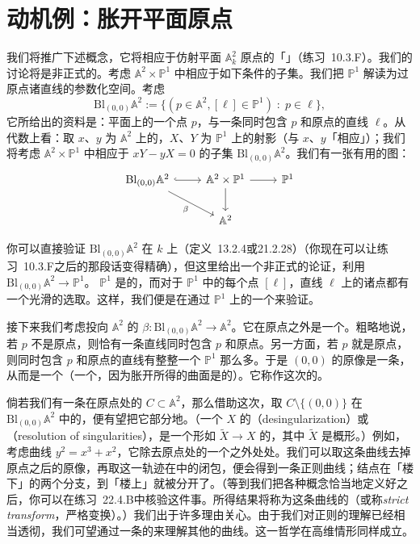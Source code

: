 
\section{动机例：胀开平面原点}

我们将推广下述概念，它将相应于仿射平面 $\mathbb{A}^2_k$ 原点的「\trBlowup」（\mbox{练习~10.3.F}）。我们的讨论将是非正式的。考虑 $\mathbb{A}^2\times\mathbb{P}^1$ 中相应于如下条件的子集。我们把 $\mathbb{P}^1$ 解读为过原点诸直线的参数化空间。考虑\trSubvariety
\[
\mathrm{Bl}_{(0,0)}\mathbb{A}^2:=\{(p\in\mathbb{A}^2,[\ell]\in\mathbb{P}^1)\;:\;p\in\ell\},
\]
它所给出的资料是：平面上的一个点 $p$，与一条同时包含 $p$ 和原点的直线 $\ell$。从代数上看：取 $x$、$y$ 为 $\mathbb{A}^2$ 上的\trCoordinate，$X$、$Y$ 为 $\mathbb{P}^1$ 上的射影\trCoordinate（与 $x$、$y$「相应」）；我们将考虑 $\mathbb{A}^2\times\mathbb{P}^1$ 中相应于 $xY-yX=0$ 的子集 $\mathrm{Bl}_{(0,0)}\mathbb{A}^2$。我们有一张有用的图：
\[
\begin{tikzcd}
\mathrm{Bl}_{(0,0)}\mathbb{A}^2\ar[r,hook]\ar[rd,"\beta"'] & \mathbb{A}^2\times\mathbb{P}^1\ar[r]\ar[d] & \mathbb{P}^1 \\
& \mathbb{A}^2 &
\end{tikzcd}
\]

你可以直接验证 $\mathrm{Bl}_{(0,0)}\mathbb{A}^2$ 在 $k$ 上\trSmooth{}（\mbox{定义~13.2.4}或\mbox{21.2.28}）（你现在可以让\mbox{练习~10.3.F}之后的那段话变得精确），但这里给出一个非正式的论证，利用\trProjection{} $\mathrm{Bl}_{(0,0)}\mathbb{A}^2\to\mathbb{P}^1$。\trProjectiveLine{} $\mathbb{P}^1$ 是\trSmooth{}的，而对于 $\mathbb{P}^1$ 中的每个点 $[\ell]$，直线 $\ell$ 上的诸点都有一个光滑的选取。这样，我们便是在通过 $\mathbb{P}^1$ 上的一个\trFibration{}来验证\trSmoothness。

接下来我们考虑投向 $\mathbb{A}^2$ 的\trProjection{} $\beta\colon\mathrm{Bl}_{(0,0)}\mathbb{A}^2\to\mathbb{A}^2$。它在原点之外是一个\trIsomorphism。粗略地说，若 $p$ 不是原点，则恰有一条直线同时包含 $p$ 和原点。另一方面，若 $p$ 就是原点，则同时包含 $p$ 和原点的直线有整整一个 $\mathbb{P}^1$ 那么多。于是 $(0,0)$ 的原像是一条\trCurve，从而是一个\trDivisor（一个\trEffectiveCartierDivisor，因为胀开所得的曲面是\trRegular{}的）。它称作这次\trBlowup{}的\trExceptionalDivisor。

倘若我们有一条在原点处\trSingular{}的\trCurve{} $C\subset\mathbb{A}^2$，那么借助这次\trBlowup，取 $C\setminus\{(0,0)\}$ 在 $\mathrm{Bl}_{(0,0)}\mathbb{A}^2$ 中的\trClosure，便有望把它部分地\trDesingularization。（一个\trVariety{} $X$ 的\textbf{\trDesingularization}（desingularization）或\textbf{\trResolutionOfSingularities}（resolution of singularities），是一个形如 $\widetilde{X}\to X$ 的\trProper{}\trBirational{}\trMorphism，其中 $\widetilde{X}$ 是\trRegular{}概形。）例如，考虑曲线 $y^2=x^3+x^2$，它除去原点处的一个\trNode{}之外处处\trRegular。我们可以取这条曲线去掉原点之后的原像，再取这一轨迹在\trBlowup{}中的闭包，便会得到一条正则曲线；结点在「楼下」的两个分支，到「楼上」就被分开了。（等到我们把各种概念恰当地定义好之后，你可以在\mbox{练习~22.4.B}中核验这件事。所得结果将称为这条曲线的\emph{\trProperTransform}（或称\emph{strict transform}，严格变换）。）我们出于许多理由关心\trDesingularization。由于我们对正则\trCurve{}的理解已经相当透彻，我们可望通过一条\trCurve{}的\trDesingularization{}来理解其他的曲线。这一哲学在高维情形同样成立。

